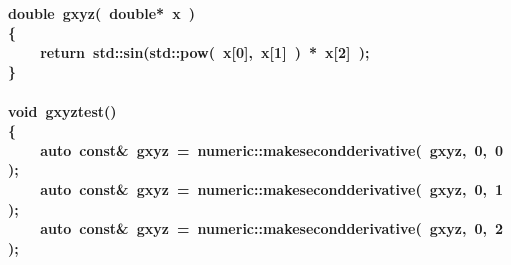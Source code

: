 \documentclass[9pt,onside,a4paper]{article}
\newcommand{\hlstd}[1]{\textcolor[rgb]{0.2,0,0.4}{#1}}
\newcommand{\hlnum}[1]{\textcolor[rgb]{0.2,0.73,0.02}{#1}}
\newcommand{\hlopt}[1]{\textcolor[rgb]{0.33,0.33,0.33}{#1}}
\newcommand{\hlkwa}[1]{\textcolor[rgb]{1,0.19,0.19}{#1}}
\newcommand{\hlkwb}[1]{\textcolor[rgb]{0.96,0.55,0.14}{#1}}
\newcommand{\hlkwc}[1]{\textcolor[rgb]{0,0,1}{#1}}
\newcommand{\hlkwd}[1]{\textcolor[rgb]{0.82,0.11,0.93}{#1}}
\begin{document}
\paragraph{
\hlkwb{double\ }\hlstd{}\hlkwd{gxyz}\hlstd{}\hlopt{(\ }\hlstd{}\hlkwb{double}\hlstd{}\hlopt{{*}\ }\hlstd{x\ }\hlopt{)}\hspace*{\fill}\\
\hlstd{}\hlopt{\{}\hspace*{\fill}\\
\hlstd{}\hlstd{\ \ \ \ }\hlstd{}\hlkwa{return\ }\hlstd{std}\hlopt{::}\hlstd{}\hlkwd{sin}\hlstd{}\hlopt{(}\hlstd{std}\hlopt{::}\hlstd{}\hlkwd{pow}\hlstd{}\hlopt{(\ }\hlstd{x}\hlopt{{[}}\hlstd{}\hlnum{0}\hlstd{}\hlopt{{]},\ }\hlstd{x}\hlopt{{[}}\hlstd{}\hlnum{1}\hlstd{}\hlopt{{]}\ )\ {*}\ }\hlstd{x}\hlopt{{[}}\hlstd{}\hlnum{2}\hlstd{}\hlopt{{]}\ );}\hspace*{\fill}\\
\hlstd{}\hlopt{\}}\hspace*{\fill}\\
\hlstd{}\hspace*{\fill}\\
\hlkwb{void\ }\hlstd{}\hlkwd{gxyz\textunderscore test}\hlstd{}\hlopt{()}\hspace*{\fill}\\
\hlstd{}\hlopt{\{}\hspace*{\fill}\\
\hlstd{}\hlstd{\ \ \ \ }\hlstd{}\hlkwc{auto\ }\hlstd{}\hlkwb{const}\hlstd{}\hlopt{\&\ }\hlstd{gxyz\ }\hlopt{=\ }\hlstd{numeric}\hlopt{::}\hlstd{}\hlkwd{make\textunderscore second\textunderscore derivative}\hlstd{}\hlopt{(\ }\hlstd{gxyz}\hlopt{,\ }\hlstd{}\hlnum{0}\hlstd{}\hlopt{,\ }\hlstd{}\hlnum{0\ }\hlstd{}\hlopt{);}\hspace*{\fill}\\
\hlstd{}\hlstd{\ \ \ \ }\hlstd{}\hlkwc{auto\ }\hlstd{}\hlkwb{const}\hlstd{}\hlopt{\&\ }\hlstd{gxyz\ }\hlopt{=\ }\hlstd{numeric}\hlopt{::}\hlstd{}\hlkwd{make\textunderscore second\textunderscore derivative}\hlstd{}\hlopt{(\ }\hlstd{gxyz}\hlopt{,\ }\hlstd{}\hlnum{0}\hlstd{}\hlopt{,\ }\hlstd{}\hlnum{1\ }\hlstd{}\hlopt{);}\hspace*{\fill}\\
\hlstd{}\hlstd{\ \ \ \ }\hlstd{}\hlkwc{auto\ }\hlstd{}\hlkwb{const}\hlstd{}\hlopt{\&\ }\hlstd{gxyz\ }\hlopt{=\ }\hlstd{numeric}\hlopt{::}\hlstd{}\hlkwd{make\textunderscore second\textunderscore derivative}\hlstd{}\hlopt{(\ }\hlstd{gxyz}\hlopt{,\ }\hlstd{}\hlnum{0}\hlstd{}\hlopt{,\ }\hlstd{}\hlnum{2\ }\hlstd{}\hlopt{);}\hspace*{\fill}\\
}
\end{document}
